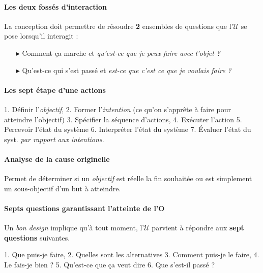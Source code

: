 \documentclass{report}
\begin{document}
\begin{multicols*}{3}
\begin{itemize}
    \end{itemize} 




    \paragraph{Les deux fossés d'interaction}
    La conception doit permettre de résoudre \textbf{2} ensembles de questions 
    que l'$\mathcal{U}$ se pose lorsqu'il interagit :
    \begin{itemize}
      \item [$\blacktriangleright$ ] Comment ça marche et 
        \textit{qu'est-ce que je peux faire avec l'objet ?}  
      \item [$\blacktriangleright$ ] Qu'est-ce qui s'est passé et 
        \textit{est-ce que c'est ce que je voulais faire ?}  
    \end{itemize}

    \paragraph{Les sept étape d'une actions}
    1. Définir l'\textit{objectif}, 2. Former l'\textit{intention} (ce qu'on s'apprête à faire pour atteindre l'objectif)   
    3. Spécifier la séquence d'actions, 4. Exécuter l'action
    5. Percevoir l'état du système 6. Interpréter l'état du système 
    7. Évaluer l'état du syst. \textit{par rapport aux intentions}.   


    \paragraph{Analyse de la cause originelle}
    Permet de déterminer si un \textit{objectif} est réelle 
    la fin souhaitée ou est simplement un sous-objectif 
    d'un but à atteindre. 

    \paragraph{Septs questions garantissant l'atteinte de l'O}
    Un \textit{bon design} implique qu'à tout moment, l'$\mathcal{U}$ 
    parvient à répondre aux \textbf{sept questions} suivantes.   

    1. Que puis-je faire, 2. Quelles sont les alternatives 
    3. Comment puis-je le faire, 4. Le fais-je bien ? 
    5. Qu'est-ce que ça veut dire 6. Que s'est-il passé ? 



\end{multicols*}
\end{document}
